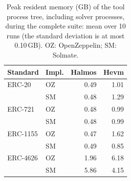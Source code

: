 \begin{table}[!htbp]
\centering
\footnotesize
\begin{tabular}{@{}llrr@{}}
\toprule
\textbf{Standard} & \textbf{Impl.} & \textbf{Halmos} & \textbf{Hevm} \\
\midrule
ERC-20   & OZ & 0.49 & 1.01 \\
         & SM & 0.48 & 1.29 \\
ERC-721  & OZ & 0.48 & 0.99 \\
         & SM & 0.48 & 0.99 \\
ERC-1155 & OZ & 0.47 & 1.62 \\
         & SM & 0.49 & 0.85 \\
ERC-4626 & OZ & 1.96 & 6.18 \\
         & SM & 5.86 & 4.15 \\
\bottomrule
\end{tabular}
\caption{Peak resident memory (GB) of the tool process tree, including solver processes, during the complete suite: mean over 10 runs (the standard deviation is at most 0.10\,GB). OZ: OpenZeppelin; SM: Solmate.}
\label{tab:memory}
\end{table}
